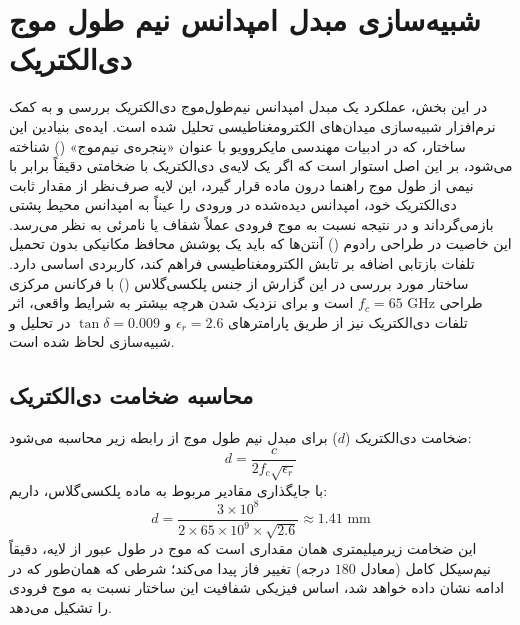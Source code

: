 \documentclass{article}
\begin{document}
	
	
	
	\newpage
	\tableofcontents
	\newpage
	
	\section{شبیه‌سازی مبدل امپدانس نیم طول موج دی‌الکتریک}
	
	در این بخش، عملکرد یک مبدل امپدانس نیم‌طول‌موج دی‌الکتریک بررسی و به کمک نرم‌افزار شبیه‌سازی میدان‌های الکترومغناطیسی  تحلیل شده است. ایده‌ی بنیادین این ساختار، که در ادبیات مهندسی مایکروویو با عنوان «پنجره‌ی نیم‌موج» () شناخته می‌شود، بر این اصل استوار است که اگر یک لایه‌ی دی‌الکتریک با ضخامتی دقیقاً برابر با نیمی از طول موج راهنما درون ماده قرار گیرد، این لایه صرف‌نظر از مقدار ثابت دی‌الکتریک خود، امپدانس دیده‌شده در ورودی را عیناً به امپدانس محیط پشتی بازمی‌گرداند و در نتیجه نسبت به موج فرودی عملاً شفاف یا نامرئی به نظر می‌رسد. این خاصیت در طراحی رادوم () آنتن‌ها که باید یک پوشش محافظ مکانیکی بدون تحمیل تلفات بازتابی اضافه بر تابش الکترومغناطیسی فراهم کند، کاربردی اساسی دارد. ساختار مورد بررسی در این گزارش از جنس پلکسی‌گلاس () با فرکانس مرکزی طراحی $f_c = 65 \text{ GHz}$ است و برای نزدیک شدن هرچه بیشتر به شرایط واقعی، اثر تلفات دی‌الکتریک نیز از طریق پارامترهای $\epsilon_r = 2.6$ و $\tan\delta = 0.009$ در تحلیل و شبیه‌سازی لحاظ شده است.
	
	\subsection{محاسبه ضخامت دی‌الکتریک}
	ضخامت دی‌الکتریک ($d$) برای مبدل نیم طول موج از رابطه زیر محاسبه می‌شود:
	\begin{equation}
		d = \frac{c}{2f_c\sqrt{\epsilon_r}}
	\end{equation}
	با جایگذاری مقادیر مربوط به ماده پلکسی‌گلاس، داریم:
	\begin{equation}
		d = \frac{3 \times 10^8}{2 \times 65 \times 10^9 \times \sqrt{2.6}} \approx 1.41 \text{ mm}
	\end{equation}
	این ضخامت زیرمیلیمتری همان مقداری است که موج در طول عبور از لایه، دقیقاً نیم‌سیکل کامل (معادل $180$ درجه) تغییر فاز پیدا می‌کند؛ شرطی که همان‌طور که در ادامه نشان داده خواهد شد، اساس فیزیکی شفافیت این ساختار نسبت به موج فرودی را تشکیل می‌دهد.
	
\end{document}

